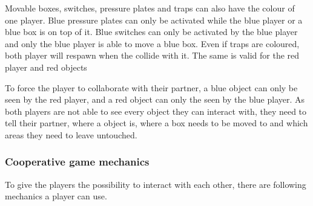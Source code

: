 Movable boxes, switches, pressure plates and traps can also have the colour of one player. 
Blue pressure plates can only be activated while the blue player or a blue box is on top of it.
Blue switches can only be activated by the blue player and only the blue player is able to move a blue box.
Even if traps are coloured, both player will respawn when the collide with it.
The same is valid for the red player and red objects

To force the player to collaborate with their partner, a blue object can only be seen by the red player, and a red object can only the seen by the blue player. As both players are not able to see every object they can interact with, they need to tell their partner, where a object is, where a box needs to be moved to and which areas they need to leave untouched.

\subsubsection{Cooperative game mechanics}
\label{Cooperative game mechanics}

To give the players the possibility to interact with each other, there are following mechanics a player can use.

